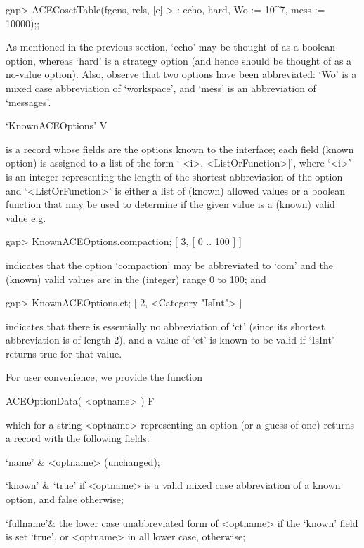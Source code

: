 \begintt
gap> ACECosetTable(fgens, rels, [c]
>                  : echo, hard, Wo := 10^7, mess := 10000);;
\endtt

As mentioned in the previous section, `echo' may be thought  of  as  a
boolean option, whereas `hard' is a strategy option (and hence  should
be thought of as a no-value option). Also, observe  that  two  options
have  been  abbreviated:  `Wo'  is  a  mixed  case   abbreviation   of
`workspace', and `mess' is an abbreviation of `messages'.


\>`KnownACEOptions' V

is a {\GAP} record whose fields are the {\ACE} options  known  to  the
{\ACE} interface; each field (known {\ACE} option) is  assigned  to  a
list of the form `[<i>, <ListOrFunction>]', where `<i>' is an  integer
representing the length of the shortest abbreviation of the option and
`<ListOrFunction>' is either a list of (known)  allowed  values  or  a
boolean function that may be used to determine if the given value is a
(known) valid value e.g.

\beginexample
gap> KnownACEOptions.compaction;
[ 3, [ 0 .. 100 ] ]

\endexample

indicates that the option `compaction' may be  abbreviated  to  `com'
and the (known) valid values are in the (integer) range 0 to 100; and

\beginexample
gap> KnownACEOptions.ct;
[ 2, <Category "IsInt"> ]

\endexample

indicates that there is essentially no abbreviation of `ct' (since its
shortest abbreviation is of length 2),  and a value of  `ct' is  known
to be valid if `IsInt' returns true for that value.

For user convenience, we provide the function

\>ACEOptionData( <optname> ) F

which for a string <optname> representing an {\ACE} option (or a guess
of one) returns a record with the following fields:

\beginitems

\quad`name'   & <optname> (unchanged);

\quad`known'  & `true' if <optname> is a valid mixed case abbreviation
of a known {\ACE} option, and false otherwise;

\quad`fullname'& the lower case unabbreviated form of <optname> if the
`known'  field  is  set  `true',  or  <optname>  in  all  lower  case,
otherwise;

